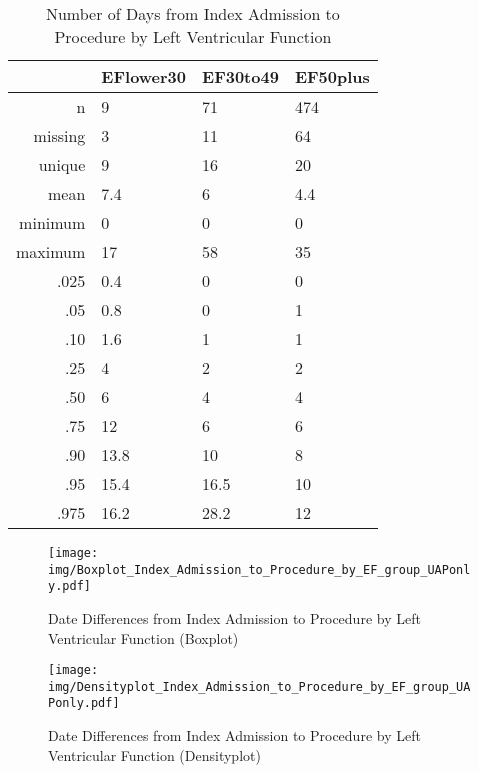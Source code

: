 \documentclass[a4paper]{report}
\begin{document}
\begin{itemize}
{%
\begin{table}[ht]
\centering
\begin{tabular}{rlll}
  \toprule
 & EFlower30 & EF30to49 & EF50plus \\ 
  \midrule
n & 9 & 71 & 474 \\ 
  missing & 3 & 11 & 64 \\ 
  unique & 9 & 16 & 20 \\ 
  mean & 7.4 & 6 & 4.4 \\ 
  minimum & 0 & 0 & 0 \\ 
  maximum & 17 & 58 & 35 \\ 
  .025 & 0.4 & 0 & 0 \\ 
  .05 & 0.8 & 0 & 1 \\ 
  .10 & 1.6 & 1 & 1 \\ 
  .25 & 4 & 2 & 2 \\ 
  .50 & 6 & 4 & 4 \\ 
  .75 & 12 & 6 & 6 \\ 
  .90 & 13.8 & 10 & 8 \\ 
  .95 & 15.4 & 16.5 & 10 \\ 
  .975 & 16.2 & 28.2 & 12 \\ 
   \bottomrule
\end{tabular}
\caption{Number of Days from Index Admission to Procedure by Left Ventricular Function} 
\end{table}
\begin{figure}
  \centering
  \caption{Date Differences from Index Admission to Procedure by Left Ventricular Function (Boxplot)}
  \label{Boxplot: Date Differences from Index Admission to Procedure by Left Ventricular Function}
\texttt{[image: img/Boxplot\_Index\_Admission\_to\_Procedure\_by\_EF\_group\_UAPonly.pdf]}\end{figure}


\begin{figure}
  \centering
  \caption{Date Differences from Index Admission to Procedure by Left Ventricular Function (Densityplot)}
  \label{Density: Date Differences from Index Admission to Procedure by Left Ventricular Function}
\texttt{[image: img/Densityplot\_Index\_Admission\_to\_Procedure\_by\_EF\_group\_UAPonly.pdf]}\end{figure}



\clearpage

}
\end{itemize}
\end{document}
